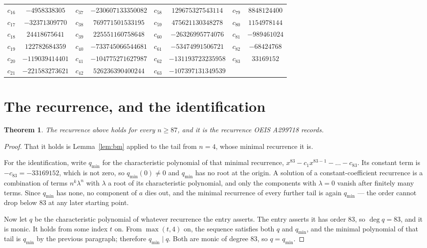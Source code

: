 \documentclass[11pt,a4paper]{article}
\theoremstyle{plain}
\newtheorem{theorem}{Theorem}
\theoremstyle{definition}
\begin{document}
\begin{center}
\begin{tabular}{cccccccc}
$c_{16}$ & $-4958338305$ & $c_{37}$ & $-230607133350082$ & $c_{58}$ & $129675327543114$ & $c_{79}$ & $8848124400$ \\
$c_{17}$ & $-32371309770$ & $c_{38}$ & $769771501533195$ & $c_{59}$ & $475621130348278$ & $c_{80}$ & $1154978144$ \\
$c_{18}$ & $24418675641$ & $c_{39}$ & $225551160758648$ & $c_{60}$ & $-26326995774076$ & $c_{81}$ & $-989461024$ \\
$c_{19}$ & $122782684359$ & $c_{40}$ & $-733745066544681$ & $c_{61}$ & $-53474991506721$ & $c_{82}$ & $-68424768$ \\
$c_{20}$ & $-119039414401$ & $c_{41}$ & $-104775271627987$ & $c_{62}$ & $-131193723235958$ & $c_{83}$ & $33169152$ \\
$c_{21}$ & $-221583273621$ & $c_{42}$ & $526236390400244$ & $c_{63}$ & $-107397131349539$ &  &  \\
\end{tabular}
\end{center}

\section{The recurrence, and the identification}

\begin{theorem}
The recurrence above holds for every $n\ge87$, and it is the recurrence OEIS A299718 records.
\end{theorem}

\begin{proof}
That it holds is Lemma~\ref{lem:bm} applied to the tail from $n=4$, whose minimal
recurrence it is.

For the identification, write $q_{\min}$ for the characteristic polynomial of that minimal
recurrence, $x^{83}-c_1x^{83-1}-\dots-c_{83}$. Its constant term is
$-c_{83}=-33169152$, which is not zero, so $q_{\min}(0)\neq0$ and $q_{\min}$ has no
root at the origin. A solution of a constant-coefficient recurrence is a combination of terms
$n^{k}\lambda^{n}$ with $\lambda$ a root of its characteristic polynomial, and only the
components with $\lambda=0$ vanish after finitely many terms. Since $q_{\min}$ has none, no
component of $a$ dies out, and the minimal recurrence of every further tail is again
$q_{\min}$ --- the order cannot drop below $83$ at any later starting point.

Now let $q$ be the characteristic polynomial of whatever recurrence the entry asserts. The
entry asserts it has order $83$, so $\deg q=83$, and it is monic. It holds from some
index $t$ on. From $\max(t,4)$ on, the sequence satisfies both $q$ and $q_{\min}$, and
the minimal polynomial of that tail is $q_{\min}$ by the previous paragraph; therefore
$q_{\min}\mid q$. Both are monic of degree $83$, so $q=q_{\min}$.
\end{proof}
\end{document}
